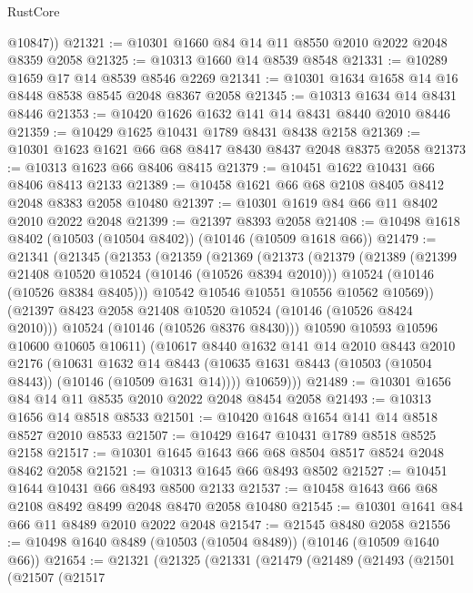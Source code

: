 \begin{lexlean}{RustCore}
\begin{coremodule}
        @10847))
@21321 := @10301 @1660 @84 @14 @11 @8550 @2010 @2022 @2048 @8359 @2058
@21325 := @10313 @1660 @14 @8539 @8548
@21331 := @10289 @1659 @17 @14 @8539 @8546 @2269
@21341 := @10301 @1634 @1658 @14 @16 @8448 @8538 @8545 @2048 @8367 @2058
@21345 := @10313 @1634 @14 @8431 @8446
@21353 := @10420 @1626 @1632 @141 @14 @8431 @8440 @2010 @8446
@21359 := @10429 @1625 @10431 @1789 @8431 @8438 @2158
@21369 := @10301 @1623 @1621 @66 @68 @8417 @8430 @8437 @2048 @8375 @2058
@21373 := @10313 @1623 @66 @8406 @8415
@21379 := @10451 @1622 @10431 @66 @8406 @8413 @2133
@21389 := @10458 @1621 @66 @68 @2108 @8405 @8412 @2048 @8383 @2058 @10480
@21397 := @10301 @1619 @84 @66 @11 @8402 @2010 @2022 @2048
@21399 := @21397 @8393 @2058
@21408 := @10498 @1618 @8402 (@10503 (@10504 @8402)) (@10146 (@10509 @1618 @66))
@21479 := @21341
    (@21345
      (@21353
        (@21359
          (@21369
            (@21373
              (@21379
                (@21389
                  (@21399 @21408 @10520 @10524 (@10146 (@10526 @8394 @2010)))
                  @10524
                  (@10146 (@10526 @8384 @8405)))
                @10542
                @10546
                @10551
                @10556
                @10562
                @10569))
            (@21397 @8423 @2058 @21408 @10520 @10524 (@10146 (@10526 @8424 @2010)))
            @10524
            (@10146 (@10526 @8376 @8430)))
          @10590
          @10593
          @10596
          @10600
          @10605
          @10611)
        (@10617
          @8440
          @1632
          @141
          @14
          @2010
          @8443
          @2010
          @2176
          (@10631
            @1632
            @14
            @8443
            (@10635 @1631 @8443 (@10503 (@10504 @8443)) (@10146 (@10509 @1631 @14))))
          @10659)))
@21489 := @10301 @1656 @84 @14 @11 @8535 @2010 @2022 @2048 @8454 @2058
@21493 := @10313 @1656 @14 @8518 @8533
@21501 := @10420 @1648 @1654 @141 @14 @8518 @8527 @2010 @8533
@21507 := @10429 @1647 @10431 @1789 @8518 @8525 @2158
@21517 := @10301 @1645 @1643 @66 @68 @8504 @8517 @8524 @2048 @8462 @2058
@21521 := @10313 @1645 @66 @8493 @8502
@21527 := @10451 @1644 @10431 @66 @8493 @8500 @2133
@21537 := @10458 @1643 @66 @68 @2108 @8492 @8499 @2048 @8470 @2058 @10480
@21545 := @10301 @1641 @84 @66 @11 @8489 @2010 @2022 @2048
@21547 := @21545 @8480 @2058
@21556 := @10498 @1640 @8489 (@10503 (@10504 @8489)) (@10146 (@10509 @1640 @66))
@21654 := @21321
    (@21325
      (@21331
        (@21479
          (@21489
            (@21493
              (@21501
                (@21507
                  (@21517

\end{coremodule}
\end{lexlean}
